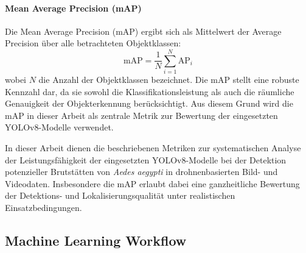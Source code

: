 \paragraph{Mean Average Precision (mAP)}
Die Mean Average Precision (mAP) ergibt sich als Mittelwert der Average Precision
über alle betrachteten Objektklassen:
\begin{equation}
    \text{mAP} = \frac{1}{N} \sum_{i=1}^{N} \text{AP}_i
\end{equation}
wobei $N$ die Anzahl der Objektklassen bezeichnet. Die mAP stellt eine robuste
Kennzahl dar, da sie sowohl die Klassifikationsleistung als auch die räumliche
Genauigkeit der Objekterkennung berücksichtigt. Aus diesem Grund wird die mAP in
dieser Arbeit als zentrale Metrik zur Bewertung der eingesetzten YOLOv8-Modelle
verwendet.

In dieser Arbeit dienen die beschriebenen Metriken zur systematischen Analyse der
Leistungsfähigkeit der eingesetzten YOLOv8-Modelle bei der Detektion potenzieller
Brutstätten von \textit{Aedes aegypti} in drohnenbasierten Bild- und Videodaten.
Insbesondere die mAP erlaubt dabei eine ganzheitliche Bewertung der Detektions-
und Lokalisierungsqualität unter realistischen Einsatzbedingungen.


\subsection{Machine Learning Workflow}

